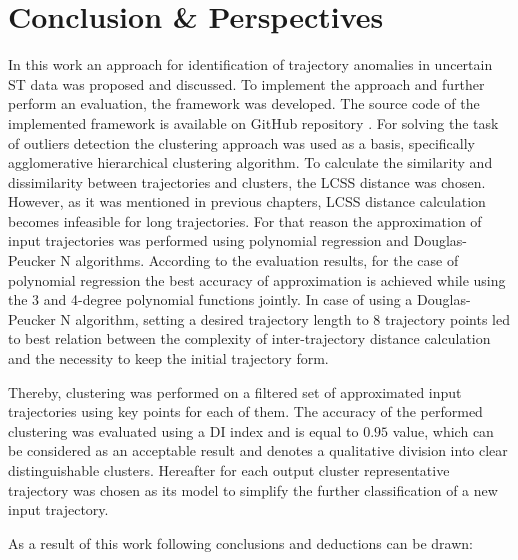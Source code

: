 \chapter{Conclusion \& Perspectives}
\label{ch:Conclusion & Perspectives}

In this work an approach for identification of trajectory anomalies in uncertain ST data was proposed and discussed. To implement the approach and further perform an evaluation, the framework was developed. The source code of the implemented framework is available on GitHub repository \cite{online:mt_anomalies}. For solving the task of outliers detection the clustering approach was used as a basis, specifically agglomerative hierarchical clustering algorithm. To calculate the similarity and dissimilarity between trajectories and clusters, the LCSS distance was chosen. However, as it was mentioned in previous chapters, LCSS distance calculation becomes infeasible for long trajectories. For that reason the approximation of input trajectories was performed using polynomial regression and Douglas-Peucker N algorithms. According to the evaluation results, for the case of polynomial regression the best accuracy of approximation is achieved while using the 3 and 4-degree polynomial functions jointly. In case of using a Douglas-Peucker N algorithm, setting a desired trajectory length to 8 trajectory points led to best relation between the complexity of inter-trajectory distance calculation and the necessity to keep the initial trajectory form. 

Thereby, clustering was performed on a filtered set of approximated input trajectories using key points for each of them. The accuracy of the performed clustering was evaluated using a DI index and is equal to $0.95$ value, which can be considered as an acceptable result and denotes a qualitative division into clear distinguishable clusters. Hereafter for each output cluster representative trajectory was chosen as its model to simplify the further classification of a new input trajectory.

As a result of this work following conclusions and deductions can be drawn:

